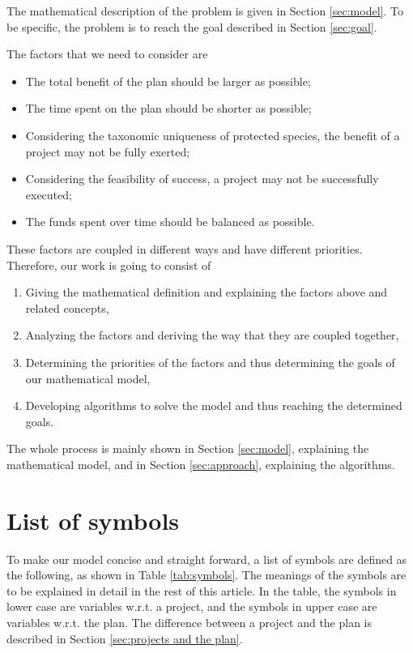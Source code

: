 \documentclass{article}
\begin{document}
The mathematical description of the problem is given in Section \ref{sec:model}.
To be specific, the problem is to reach the goal described in Section \ref{sec:goal}.

The factors that we need to consider are
\begin{itemize}
\item The total benefit of the plan should be larger as possible;
\item The time spent on the plan should be shorter as possible;
\item Considering the taxonomic uniqueness of protected species, the benefit of a project may not be fully exerted;
\item Considering the feasibility of success, a project may not be successfully executed;
\item The funds spent over time should be balanced as possible.
\end{itemize}

These factors are coupled in different ways and have different priorities.
Therefore, our work is going to consist of
\begin{enumerate}
\item Giving the mathematical definition and explaining the factors above and related concepts,
\item Analyzing the factors and deriving the way that they are coupled together,
\item Determining the priorities of the factors and thus determining the goals of our mathematical model,
\item Developing algorithms to solve the model and thus reaching the determined goals.
\end{enumerate}

The whole process is mainly shown in Section \ref{sec:model}, explaining the mathematical model, and in Section \ref{sec:approach}, explaining the algorithms.

\section{List of symbols}

To make our model concise and straight forward, a list of symbols are defined as the following, as shown in Table \ref{tab:symbols}.
The meanings of the symbols are to be explained in detail in the rest of this article.
In the table, the symbols in lower case are variables w.r.t. a project,
and the symbols in upper case are variables w.r.t. the plan.
The difference between a project and the plan is described in Section \ref{sec:projects and the plan}.
\end{document}
